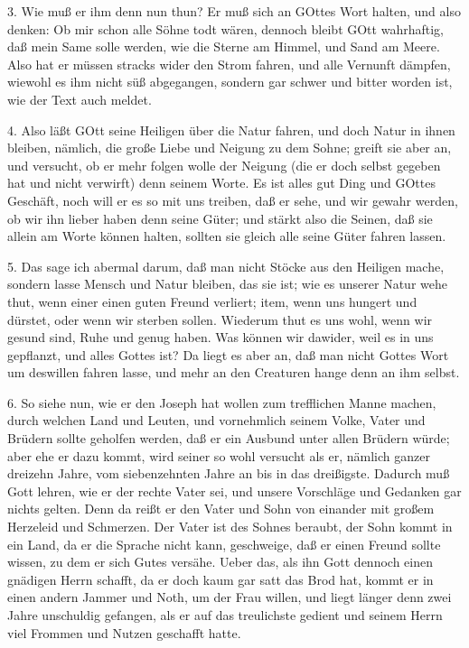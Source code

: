 3. Wie muß er ihm denn nun thun? Er muß sich an GOttes Wort halten, und also denken: Ob mir schon alle Söhne todt wären, dennoch bleibt GOtt wahrhaftig, daß mein Same solle werden, wie die Sterne am Himmel, und Sand am Meere. Also hat er müssen stracks wider den Strom fahren, und alle Vernunft dämpfen, wiewohl es ihm nicht süß abgegangen, sondern gar schwer und bitter worden ist, wie der Text auch meldet.

4. Also läßt GOtt seine Heiligen über die Natur fahren, und doch Natur in ihnen bleiben, nämlich, die große Liebe und Neigung zu dem Sohne; greift sie aber an, und versucht, ob er mehr folgen wolle der Neigung (die er doch selbst gegeben hat und nicht verwirft) denn seinem Worte. Es ist alles gut Ding und GOttes Geschäft, noch will er es so mit uns treiben, daß er sehe, und wir gewahr werden, ob wir ihn lieber haben denn seine Güter; und stärkt also die Seinen, daß sie allein am Worte können halten, sollten sie gleich alle seine Güter fahren lassen.

5. Das sage ich abermal darum, daß man nicht Stöcke aus den Heiligen mache, sondern lasse Mensch und Natur bleiben, das sie ist; wie es unserer Natur wehe thut, wenn einer einen guten Freund verliert; item, wenn uns hungert und dürstet, oder wenn wir sterben sollen. Wiederum
thut es uns wohl, wenn wir gesund sind, Ruhe und genug haben. Was können wir dawider, weil es in uns gepflanzt, und alles Gottes ist? Da liegt es aber an, daß man nicht Gottes Wort um deswillen fahren lasse, und mehr an den Creaturen hange denn an ihm selbst.

6. So siehe nun, wie er den Joseph hat wollen zum trefflichen Manne machen, durch welchen Land und Leuten, und vornehmlich seinem Volke, Vater und Brüdern sollte geholfen werden, daß er ein Ausbund unter allen Brüdern würde; aber ehe er dazu kommt, wird seiner so wohl versucht als er, nämlich ganzer dreizehn Jahre, vom siebenzehnten Jahre an bis in das dreißigste. Dadurch muß Gott lehren, wie er der rechte Vater sei, und unsere Vorschläge und Gedanken gar nichts gelten. Denn da reißt er den Vater und Sohn von einander mit großem Herzeleid und Schmerzen. Der Vater ist des Sohnes beraubt, der Sohn kommt in ein Land, da er die Sprache nicht kann, geschweige, daß er einen Freund sollte wissen, zu dem er sich Gutes versähe. Ueber das, als ihn Gott dennoch einen gnädigen Herrn schafft, da er doch kaum gar satt das Brod hat, kommt er in einen andern Jammer und Noth, um der Frau willen, und liegt länger denn zwei Jahre unschuldig gefangen, als er auf das treulichste gedient und seinem Herrn viel Frommen und Nutzen geschafft hatte.

